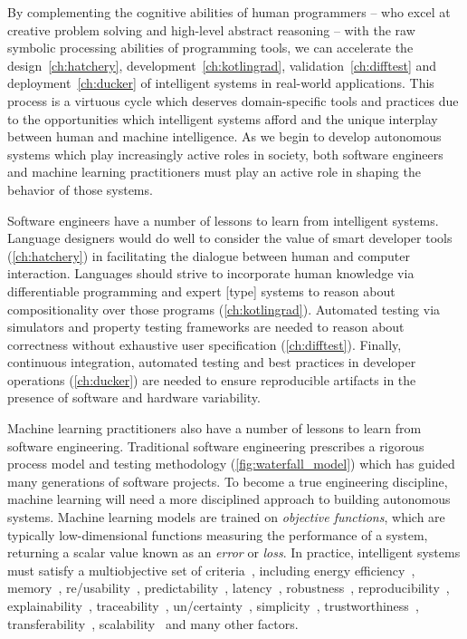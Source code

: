 By complementing the cognitive abilities of human programmers -- who excel at creative problem solving and high-level abstract reasoning -- with the raw symbolic processing abilities of programming tools, we can accelerate the design~\autoref{ch:hatchery}, development~\autoref{ch:kotlingrad}, validation~\autoref{ch:difftest} and deployment~\autoref{ch:ducker} of intelligent systems in real-world applications. This process is a virtuous cycle which deserves domain-specific tools and practices due to the opportunities which intelligent systems afford and the unique interplay between human and machine intelligence. As we begin to develop autonomous systems which play increasingly active roles in society, both software engineers and machine learning practitioners must play an active role in shaping the behavior of those systems.

Software engineers have a number of lessons to learn from intelligent systems. Language designers would do well to consider the value of smart developer tools (\autoref{ch:hatchery}) in facilitating the dialogue between human and computer interaction. Languages should strive to incorporate human knowledge via differentiable programming and expert [type] systems to reason about compositionality over those programs (\autoref{ch:kotlingrad}). Automated testing via simulators and property testing frameworks are needed to reason about correctness without exhaustive user specification (\autoref{ch:difftest}). Finally, continuous integration, automated testing and best practices in developer operations (\autoref{ch:ducker}) are needed to ensure reproducible artifacts in the presence of software and hardware variability.

Machine learning practitioners also have a number of lessons to learn from software engineering. Traditional software engineering prescribes a rigorous process model and testing methodology (\autoref{fig:waterfall_model}) which has guided many generations of software projects. To become a true engineering discipline, machine learning will need a more disciplined approach to building autonomous systems. Machine learning models are trained on \textit{objective functions}, which are typically low-dimensional functions measuring the performance of a system, returning a scalar value known as an \textit{error} or \textit{loss}. In practice, intelligent systems must satisfy a multiobjective set of criteria~\citep{censi2015mathematical}, including energy efficiency~\citep{paull2010novel}, memory~\citep{memory2013mitliagkas}, re/usability~\citep{breuleux2017automatic,deleu2019torchmeta}, predictability~\citep{turner2017well}, latency~\citep{ravanelli2018twin}, robustness~\citep{pineau2003policy}, reproducibility~\citep{pineau2019improving}, explainability~\citep{turner2016model}, traceability~\citep{guo2017semantically, tsirigotis2018orion}, un/certainty~\citep{diaz2018interactive}, simplicity~\citep{kastner2019representation}, trustworthiness~\citep{xu2017efficient}, transferability~\citep{mehta2019active}, scalability~\citep{luan2019break} and many other factors.

